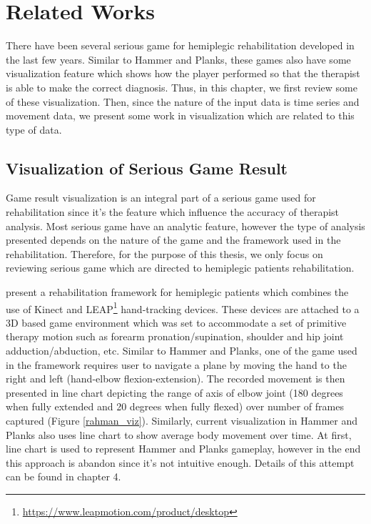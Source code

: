 \chapter{Related Works}
\label{chap:related}

There have been several serious game for hemiplegic rehabilitation developed in the last few years. Similar to Hammer and Planks, these games also have some visualization feature which shows how the player performed so that the therapist is able to make the correct diagnosis. Thus, in this chapter, we first review some of these visualization. Then, since the nature of the input data is time series and movement data, we present some work in visualization which are related to this type of data.

\section{Visualization of Serious Game Result} 

Game result visualization is an integral part of a serious game used for rehabilitation since it's the feature which influence the accuracy of therapist analysis. Most serious game have an analytic feature, however the type of analysis presented depends on the nature of the game and the framework used in the rehabilitation. Therefore, for the purpose of this thesis, we only focus on reviewing serious game which are directed to hemiplegic patients rehabilitation.

\cite{rahman} present a rehabilitation framework for hemiplegic patients which combines the use of Kinect and LEAP\footnote{\url{https://www.leapmotion.com/product/desktop}} hand-tracking devices. These devices are attached to a 3D based game environment which was set to accommodate a set of primitive therapy motion such as forearm pronation/supination, shoulder and hip joint adduction/abduction, etc. Similar to Hammer and Planks, one of the game used in the framework requires user to navigate a plane by moving the hand to the right and left (hand-elbow flexion-extension). The recorded movement is then presented in line chart depicting the range of axis of elbow joint (180 degrees when fully extended and 20 degrees when fully flexed) over number of frames captured (Figure \ref{rahman_viz}). Similarly, current visualization in Hammer and Planks also uses line chart to show average body movement over time. At first, line chart is used to represent Hammer and Planks gameplay, however in the end this approach is abandon since it's not intuitive enough. Details of this attempt can be found in chapter 4.


